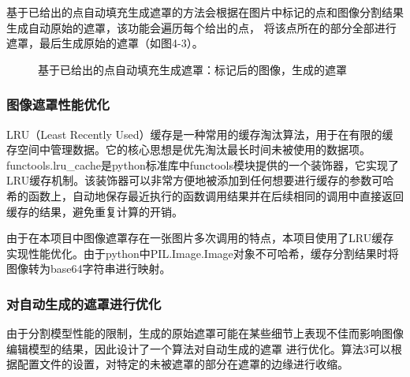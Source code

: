 \documentclass[a4paper,AutoFakeBold,oneside,12pt]{book}
\begin{document}
基于已给出的点自动填充生成遮罩的方法会根据在图片中标记的点和图像分割结果生成自动原始的遮罩，该功能会遍历每个给出的点，
将该点所在的部分全部进行遮罩，最后生成原始的遮罩（如图4-3）。
\begin{figure}[!htbp]
    \centering
    \quad %
    \caption{基于已给出的点自动填充生成遮罩：\protect{}标记后的图像，\protect{}生成的遮罩} %
    \label{Fig:Point} 
\end{figure}

\subsubsection{图像遮罩性能优化}
LRU（Least Recently Used）缓存是一种常用的缓存淘汰算法，用于在有限的缓存空间中管理数据。它的核心思想是优先淘汰最长时间未被使用的数据项。
functools.lru\_cache是python标准库中functools模块提供的一个装饰器，它实现了LRU缓存机制。该装饰器可以非常方便地被添加到任何想要进行缓存的参数可哈希的函数上，自动地保存最近执行的函数调用结果并在后续相同的调用中直接返回缓存的结果，避免重复计算的开销。

由于在本项目中图像遮罩存在一张图片多次调用的特点，本项目使用了LRU缓存实现性能优化。由于python中PIL.Image.Image对象不可哈希，缓存分割结果时将图像转为base64字符串进行映射。
\subsubsection{对自动生成的遮罩进行优化}
由于分割模型性能的限制，生成的原始遮罩可能在某些细节上表现不佳而影响图像编辑模型的结果，因此设计了一个算法对自动生成的遮罩
进行优化。算法3可以根据配置文件的设置，对特定的未被遮罩的部分在遮罩的边缘进行收缩。
\end{document}
